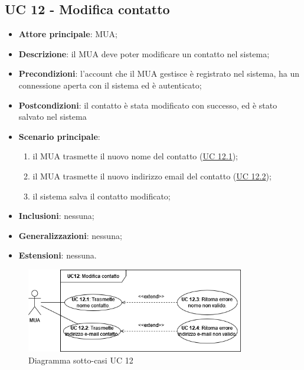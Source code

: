\subsection{UC 12 - Modifica contatto} \label{sec:UC12}
    \begin{itemize}
        \item \textbf{Attore principale}: MUA;
        \item \textbf{Descrizione}: il MUA deve poter modificare un contatto nel sistema;
        \item \textbf{Precondizioni}: l’account che il MUA gestisce è registrato nel sistema, ha un connessione aperta con il sistema ed è autenticato;
        \item \textbf{Postcondizioni}: il contatto è stata modificato con successo, ed è stato salvato nel sistema
        \item \textbf{Scenario principale}:
            \begin{enumerate}
                \item il MUA trasmette il nuovo nome del contatto (\hyperref[sec:UC12.1]{UC 12.1});
                \item il MUA trasmette il nuovo indirizzo email del contatto (\hyperref[sec:UC12.2]{UC 12.2});
                \item il sistema salva il contatto modificato;
            \end{enumerate}
        \item \textbf{Inclusioni}: nessuna;
        \item \textbf{Generalizzazioni}: nessuna;
        \item \textbf{Estensioni}: nessuna.
    \end{itemize}

\begin{figure}[h]
    \includegraphics[width=0.85\textwidth]{sections/uc_imgs/UC12.png}
    \centering
    \caption{Diagramma sotto-casi UC 12}
\end{figure}

